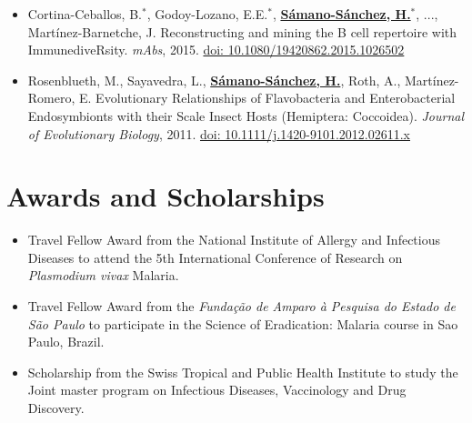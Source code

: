 \documentclass[11pt,a4paper,sans]{moderncv} %
\begin{document}
\begin{itemize}
  \item Cortina-Ceballos, B.$^{\ast}$, Godoy-Lozano, E.E.$^{\ast}$, \textbf{\underline{S\'amano-S\'anchez, H.}}$^{\ast}$, ..., Mart\'inez-Barnetche, J. Reconstructing and mining the B cell repertoire with ImmunediveRsity. \textit{mAbs}, 2015. \href{https://doi.org/10.1080/19420862.2015.1026502}{doi: 10.1080/19420862.2015.1026502}
  \item Rosenblueth, M., Sayavedra, L., \textbf{\underline{S\'amano-S\'anchez, H.}}, Roth, A., Mart\'inez-Romero, E. Evolutionary Relationships of Flavobacteria and Enterobacterial Endosymbionts with their Scale Insect Hosts (Hemiptera: Coccoidea). \textit{Journal of Evolutionary Biology}, 2011. \href{https://doi.org/10.1111/j.1420-9101.2012.02611.x}{doi: 10.1111/j.1420-9101.2012.02611.x}\\
\end{itemize}

\section{Awards and Scholarships}
\begin{itemize}
  \item Travel Fellow Award from the National Institute of Allergy and Infectious Diseases to attend the 5th International Conference of Research on \textit{Plasmodium vivax} Malaria.
  \item Travel Fellow Award from the \textit{Funda\c c\~ao de Amparo \`a Pesquisa do Estado de S\~ao Paulo} to participate in the Science of Eradication: Malaria course in Sao Paulo, Brazil.
  \item Scholarship from the Swiss Tropical and Public Health Institute to study the Joint master program on Infectious Diseases, Vaccinology and Drug Discovery.\\
\end{itemize}
\end{document}
